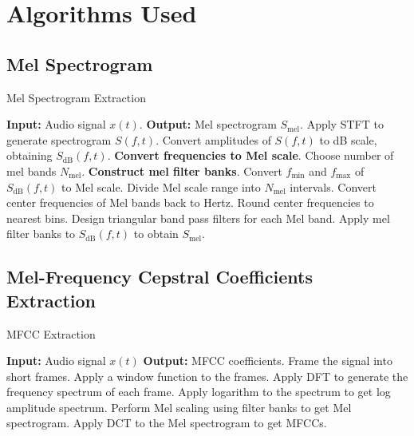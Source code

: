 \section{Algorithms Used}
\subsection{Mel Spectrogram}
\begin{algorithm}[H]
    \caption{Mel Spectrogram Extraction}
    \begin{algorithmic}[1]

        \STATE \textbf{Input:} Audio signal $x(t)$.
        \STATE \textbf{Output:} Mel spectrogram $S_{\text{mel}}$.
        \STATE Apply STFT to generate spectrogram $S(f, t)$.
        \STATE Convert amplitudes of $S(f, t)$ to dB scale, obtaining
        $S_{\text{dB}}(f, t)$.
        \STATE \textbf{Convert frequencies to Mel scale}.
        \STATE \hspace{10} Choose number of mel bands $N_{\text{mel}}$.
        \STATE \textbf{Construct mel filter banks}.
        \STATE \hspace{10} Convert $f_{\text{min}}$ and $f_{\text{max}}$ of
        $S_{\text{dB}}(f, t)$ to Mel scale.
        \STATE \hspace{10} Divide Mel scale range into $N_{\text{mel}}$
        intervals.
        \STATE \hspace{10} Convert center frequencies of Mel bands back to
        Hertz.
        \STATE \hspace{10} Round center frequencies to nearest bins.
        \STATE \hspace{10} Design triangular band pass filters for each Mel
        band.
        \STATE \hspace{10} Apply mel filter banks to $S_{\text{dB}}(f, t)$ to
        obtain $S_{\text{mel}}$.
    \end{algorithmic}
\end{algorithm}

\subsection{Mel-Frequency Cepstral Coefficients Extraction}

\begin{algorithm}[H]
    \caption{MFCC Extraction}
    \begin{algorithmic}[1]

        \STATE \textbf{Input:} Audio signal $x(t)$
        \STATE \textbf{Output:} MFCC coefficients.
        \STATE Frame the signal into short frames.
        \STATE Apply a window function to the frames.
        \STATE Apply DFT to generate the frequency spectrum of each frame.
        \STATE Apply logarithm to the spectrum to get log amplitude spectrum.
        \STATE Perform Mel scaling using filter banks to get Mel spectrogram.
        \STATE Apply DCT to the Mel spectrogram to get MFCCs.
    \end{algorithmic}
\end{algorithm}

